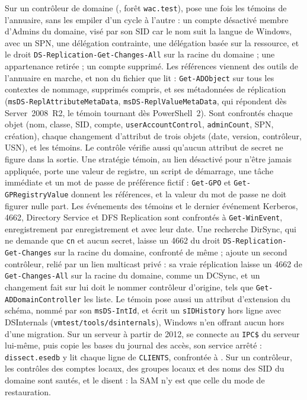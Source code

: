\documentclass[11pt,a4paper,oneside]{report}
\begin{document}
Sur un contrôleur de domaine (, forêt
\texttt{wac.test}),  pose une fois
les témoins de l'annuaire, sans les empiler d'un cycle à l'autre : un compte
désactivé membre d'Admins du domaine, visé par son SID car le nom suit la
langue de Windows, avec un SPN, une délégation contrainte, une délégation basée
sur la ressource, et le droit \texttt{DS-Replication-Get-Changes-All} sur la
racine du domaine ; une appartenance retirée ; un compte supprimé. Les
références viennent des outils de l'annuaire en marche, et non du fichier que
lit \wac{} : \texttt{Get-ADObject} sur tous les contextes de nommage, supprimés
compris, et ses métadonnées de réplication (\texttt{msDS-ReplAttributeMetaData},
\texttt{msDS-ReplValueMetaData}, qui répondent dès Server~2008~R2, le témoin
tournant dès PowerShell~2). Sont confrontés chaque
objet (nom, classe, SID, compte, \texttt{userAccountControl},
\texttt{adminCount}, SPN, création), chaque changement d'attribut de trois
objets (date, version, contrôleur, USN), et les témoins. Le contrôle vérifie
aussi qu'aucun attribut de secret ne figure dans la sortie. Une stratégie
témoin, au lien désactivé pour n'être jamais appliquée, porte une valeur de
registre, un script de démarrage, une tâche immédiate et un mot de passe de
préférence fictif : \texttt{Get-GPO} et \texttt{Get-GPRegistryValue} donnent les
références, et la valeur du mot de passe ne doit figurer nulle part. Les
événements des témoins et le dernier événement Kerberos, 4662, Directory Service
et DFS Replication sont confrontés à \texttt{Get-WinEvent}, enregistrement par
enregistrement et avec leur date. Une recherche DirSync, qui ne demande que
\texttt{cn} et aucun secret, laisse un 4662 du droit
\texttt{DS-Replication-Get-Changes} sur la racine du domaine, confronté de même ;
 ajoute un second contrôleur, relié par
un lien multicast privé : sa vraie réplication laisse un 4662 de
\texttt{Get-Changes-All} sur la racine du domaine, comme un DCSync, et un
changement fait sur lui doit le nommer contrôleur d'origine, tels que
\texttt{Get-ADDomainController} les liste. Le témoin pose aussi un attribut
d'extension du schéma, nommé par son \texttt{msDS-IntId}, et
 écrit un \texttt{sIDHistory} hors ligne avec
DSInternals (\texttt{vmtest/tools/dsinternals}), Windows n'en offrant aucun hors
d'une migration. Sur un serveur à partir de 2012,
 se connecte au \texttt{IPC\$} du
serveur lui-même, puis copie les bases du journal des accès, son service arrêté :
\texttt{dissect.esedb} y lit chaque ligne de \texttt{CLIENTS}, confrontée à
. Sur un
contrôleur, les contrôles des comptes locaux, des groupes locaux et des noms des
SID du domaine sont sautés, et le disent : la SAM n'y est que celle du mode de
restauration.
\end{document}
